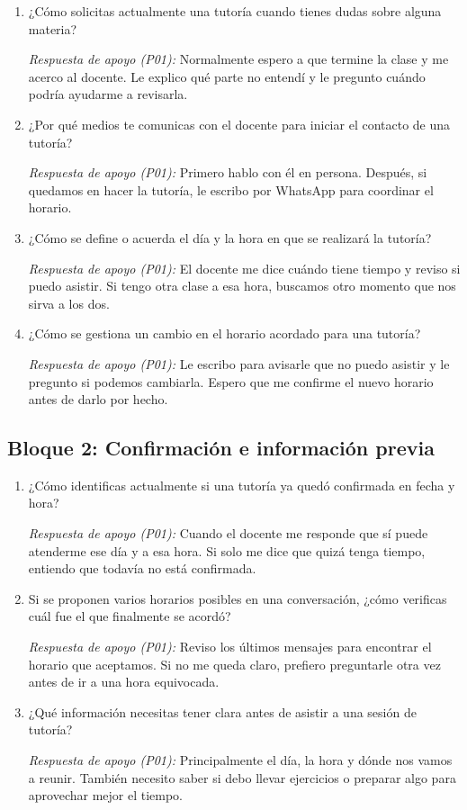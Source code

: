 \documentclass[11pt,a4paper]{article}
\begin{document}
\begin{enumerate}[label=\textbf{\arabic*.}]
    \item ¿Cómo solicitas actualmente una tutoría cuando tienes
    dudas sobre alguna materia?

    \textit{Respuesta de apoyo (P01):} Normalmente espero a que termine la clase y me acerco al docente. Le explico qué parte no entendí y le pregunto cuándo podría ayudarme a revisarla.

    \item ¿Por qué medios te comunicas con el docente para
    iniciar el contacto de una tutoría?

    \textit{Respuesta de apoyo (P01):} Primero hablo con él en persona. Después, si quedamos en hacer la tutoría, le escribo por WhatsApp para coordinar el horario.

    \item ¿Cómo se define o acuerda el día y la hora en que
    se realizará la tutoría?

    \textit{Respuesta de apoyo (P01):} El docente me dice cuándo tiene tiempo y reviso si puedo asistir. Si tengo otra clase a esa hora, buscamos otro momento que nos sirva a los dos.

    \item ¿Cómo se gestiona un cambio en el horario acordado
    para una tutoría?

    \textit{Respuesta de apoyo (P01):} Le escribo para avisarle que no puedo asistir y le pregunto si podemos cambiarla. Espero que me confirme el nuevo horario antes de darlo por hecho.
\end{enumerate}

\subsection{Bloque 2: Confirmación e información previa}

\begin{enumerate}[resume,label=\textbf{\arabic*.}]
    \item ¿Cómo identificas actualmente si una tutoría ya
    quedó confirmada en fecha y hora?

    \textit{Respuesta de apoyo (P01):} Cuando el docente me responde que sí puede atenderme ese día y a esa hora. Si solo me dice que quizá tenga tiempo, entiendo que todavía no está confirmada.

    \item Si se proponen varios horarios posibles en una
    conversación, ¿cómo verificas cuál fue el que finalmente
    se acordó?

    \textit{Respuesta de apoyo (P01):} Reviso los últimos mensajes para encontrar el horario que aceptamos. Si no me queda claro, prefiero preguntarle otra vez antes de ir a una hora equivocada.

    \item ¿Qué información necesitas tener clara antes de
    asistir a una sesión de tutoría?

    \textit{Respuesta de apoyo (P01):} Principalmente el día, la hora y dónde nos vamos a reunir. También necesito saber si debo llevar ejercicios o preparar algo para aprovechar mejor el tiempo.
\end{enumerate}
\end{document}
